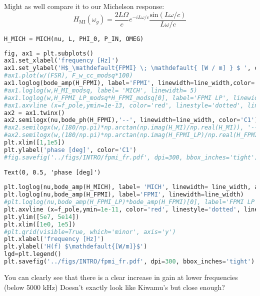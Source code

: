 Might as well compare it to our Michelson response:
\[ H_{\mathrm{MI}}(\omega_g) = \frac{2 L \Omega}{c}e^{-i L \omega / c} \frac{\mathrm{sin}(L \omega /c)}{L \omega /c} \]

\begin{lstlisting}[frame=single, language=Python]
H_MICH = MICH(nu, L, PHI_0, P_IN, OMEG)
\end{lstlisting}

\begin{lstlisting}[frame=single, language=Python]
fig, ax1 = plt.subplots()
ax1.set_xlabel('frequency [Hz]')
ax1.set_ylabel('H$_\mathdefault{FPMI} \; \mathdefault{ [W / m] } $ ', color='C0')
#ax1.plot(w/(FSR), F_w_cc_modsq*100)
ax1.loglog(bode_amp(H_FPMI), label='FPMI', linewidth=line_width,color='C0')
#ax1.loglog(w,H_MI_modsq, label= 'MICH', linewidth= 5)
#ax1.loglog(w,H_FPMI_LP_modsq*H_FPMI_modsq[0], label='FPMI LP', linewidth = 20.0, alpha=0.25,color='C2')
#ax1.axvline (x=f_pole,ymin=1e-13, color='red', linestyle='dotted', linewidth=3)
ax2 = ax1.twinx()
ax2.semilogx(nu,bode_ph(H_FPMI),'--', linewidth=line_width, color='C1')
#ax2.semilogx(w,(180/np.pi)*np.arctan(np.imag(H_MI)/np.real(H_MI)), '--')
#ax2.semilogx(w,(180/np.pi)*np.arctan(np.imag(H_FPMI_LP)/np.real(H_FPMI_LP)),linestyle='--', linewidth=20.0,dashes=(4,10),alpha=.25, color='C2')
plt.xlim([1,1e5])
plt.ylabel('phase [deg]', color='C1')
#fig.savefig('../figs/INTRO/fpmi_fr.pdf', dpi=300, bbox_inches='tight')
\end{lstlisting}

\begin{lstlisting}
Text(0, 0.5, 'phase [deg]')
\end{lstlisting}

\begin{lstlisting}[frame=single, language=Python]
plt.loglog(nu,bode_amp(H_MICH), label= 'MICH', linewidth= line_width, alpha=.5)
plt.loglog(nu,bode_amp(H_FPMI), label='FPMI', linewidth=line_width)
#plt.loglog(nu,bode_amp(H_FPMI_LP)*bode_amp(H_FPMI)[0], label='FPMI LP', linewidth = 20.0, alpha=0.25)
plt.axvline (x=f_pole,ymin=1e-11, color='red', linestyle='dotted', linewidth=3.0)
plt.ylim([5e7, 5e14])
plt.xlim([1e0, 1e5])
#plt.grid(visible=True, which='minor', axis='y')
plt.xlabel('frequency [Hz]')
plt.ylabel('H(f) $\mathdefault{[W/m]}$')
lgd=plt.legend()
plt.savefig('../figs/INTRO/fpmi_fr.pdf', dpi=300, bbox_inches='tight')
\end{lstlisting}

You can clearly see that there is a clear increase in gain at lower
frequencies (below 5000 kHz) Doesn't exactly look like Kiwamu's but
close enough?

